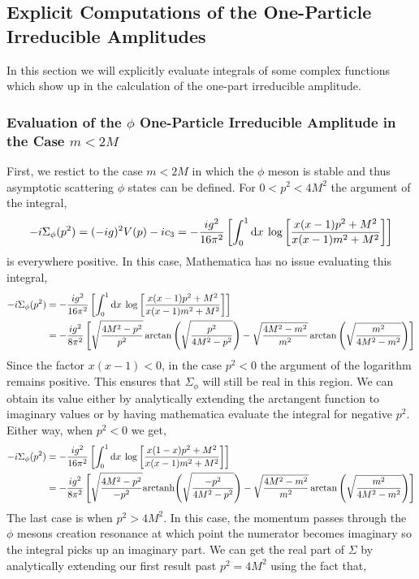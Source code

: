 \documentclass{article}
\begin{document}
\subsection{Explicit Computations of the One-Particle Irreducible Amplitudes}
In this section we will explicitly evaluate integrals of some complex functions which show up in the calculation of the one-part irreducible amplitude. 
\subsubsection{Evaluation of the $\phi$ One-Particle Irreducible Amplitude in the Case $m < 2 M$}

First, we restict to the case $m < 2 M$ in which the $\phi$ meson is stable and thus asymptotic scattering $\phi$ states can be defined. For $0 < p^2 < 4 M^2$ the argument of the integral,
\[ - i \Sigma_\phi(p^2) = (-ig)^2 V(p) - i c_3 = - \frac{ig^2}{16 \pi^2} \left[ \int_{0}^{1} \mathrm{d}x \: \log{\left[\frac{x(x - 1) p^2 + M^2}{x(x - 1) m^2 + M^2} \right]} \right] \]
is everywhere positive. In this case, Mathematica has no issue evaluating this integral, 
\begin{align*}
- i \Sigma_\phi(p^2) &= - \frac{ig^2}{16 \pi^2} \left[ \int_{0}^{1} \mathrm{d}x \: \log{\left[\frac{x(x - 1) p^2 + M^2}{x(x - 1) m^2 + M^2} \right]} \right] 
\\
& = - \frac{ig^2}{8 \pi^2} \left[ \sqrt{\frac{4 M^2 - p^2}{p^2}} \arctan{\left( \sqrt{\frac{p^2}{4 M^2 - p^2}} \right)} - \sqrt{\frac{4 M^2 - m^2}{m^2}} \arctan{\left( \sqrt{\frac{m^2}{4 M^2 - m^2}}\right)}\right]
\end{align*}
Since the factor $x(x-1) < 0$, in the case $p^2 < 0$ the argument of the logarithm remains positive. This ensures that $\Sigma_\phi$ will still be real in this region. We can obtain its value either by analytically extending the arctangent function to imaginary values or by having mathematica evaluate the integral for negative $p^2$. Either way, when $p^2 < 0$ we get,
\begin{align*}
- i \Sigma_\phi(p^2) &= - \frac{ig^2}{16 \pi^2} \left[ \int_{0}^{1} \mathrm{d}x \: \log{\left[\frac{x(1 - x) p^2 + M^2}{x(x - 1) m^2 + M^2} \right]} \right] 
\\
& = - \frac{ig^2}{8 \pi^2} \left[ \sqrt{\frac{4 M^2 - p^2}{-p^2}} \mathrm{arctanh}{\left(\sqrt{\frac{-p^2}{4 M^2 - p^2}}\right)} - \sqrt{\frac{4 M^2 - m^2}{m^2}} \arctan{\left(\sqrt{\frac{m^2}{4 M^2 - m^2}}\right)}\right]
\end{align*}
The last case is when $p^2 > 4 M^2$. In this case, the momentum passes through the $\phi$ mesons creation resonance at which point the numerator becomes imaginary so the integral picks up an imaginary part. We can get the real part of $\Sigma$ by analytically extending our first result past $p^2 = 4 M^2$ using the fact that,
\end{document}
